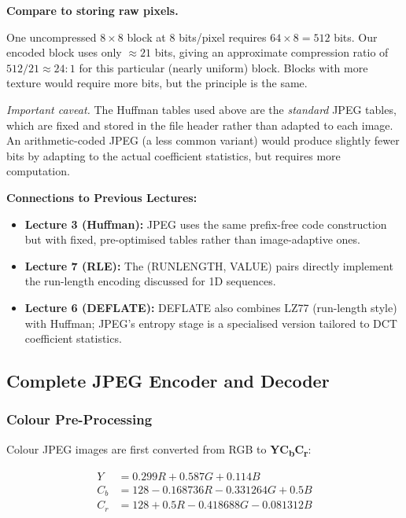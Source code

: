 \begin{examplebox}
\medskip
\noindent\textbf{Compare to storing raw pixels.}

One uncompressed $8\times8$ block at 8 bits/pixel requires $64\times8=512$ bits.
Our encoded block uses only $\approx21$ bits, giving an approximate compression
ratio of $512/21\approx24:1$ for this particular (nearly uniform) block.  Blocks
with more texture would require more bits, but the principle is the same.

\medskip
\noindent\textit{Important caveat.} The Huffman tables used above are the
\emph{standard} JPEG tables, which are fixed and stored in the file header
rather than adapted to each image.  An arithmetic-coded JPEG (a less common
variant) would produce slightly fewer bits by adapting to the actual
coefficient statistics, but requires more computation.
\end{examplebox}

\begin{connectionbox}
\textbf{Connections to Previous Lectures:}
\begin{itemize}[nosep]
  \item \textbf{Lecture 3 (Huffman):} JPEG uses the same prefix-free code construction but with fixed, pre-optimised tables rather than image-adaptive ones.
  \item \textbf{Lecture 7 (RLE):} The (RUNLENGTH, VALUE) pairs directly implement the run-length encoding discussed for 1D sequences.
  \item \textbf{Lecture 6 (DEFLATE):} DEFLATE also combines LZ77 (run-length style) with Huffman; JPEG's entropy stage is a specialised version tailored to DCT coefficient statistics.
\end{itemize}
\end{connectionbox}

\subsection{Complete JPEG Encoder and Decoder}

\subsubsection{Colour Pre-Processing}

Colour JPEG images are first converted from RGB to \textbf{YC\textsubscript{b}C\textsubscript{r}}:

\begin{align}
  Y  &= 0.299R + 0.587G + 0.114B \tag{luminance}\\
  C_b &= 128 - 0.168736R - 0.331264G + 0.5B \tag{blue chroma}\\
  C_r &= 128 + 0.5R - 0.418688G - 0.081312B \tag{red chroma}
\end{align}

